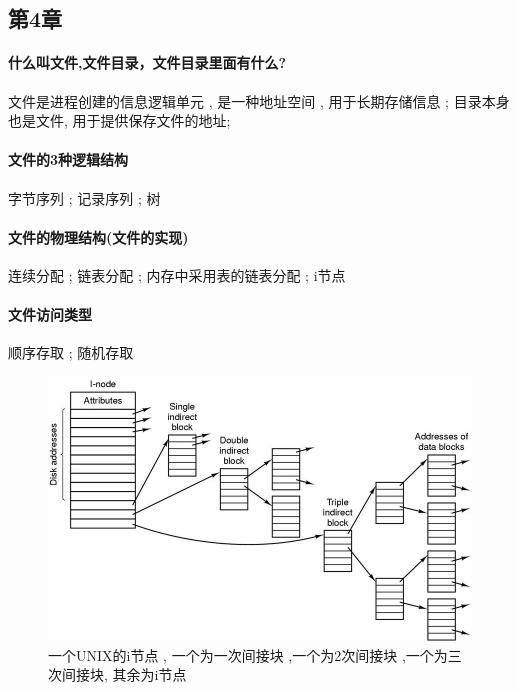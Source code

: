 \documentclass[UTF8,a4paper]{ctexart}
\begin{document}
\subsection{第4章}
\paragraph{什么叫文件,文件目录，文件目录里面有什么?}
文件是进程创建的信息逻辑单元 , 是一种地址空间 , 用于长期存储信息 ; 目录本身也是文件, 用于提供保存文件的地址;

\paragraph{文件的3种逻辑结构}  字节序列 ; 记录序列 ; 树

\paragraph{文件的物理结构(文件的实现)} 连续分配 ; 链表分配 ; 内存中采用表的链表分配 ; i节点

\paragraph{文件访问类型} 顺序存取 ; 随机存取

\begin{figure}[H]
	\centering
	\includegraphics[scale = 0.6]{assets/ModernOperatingSystems/2018-01-08-19-49-31.png}
	\caption{一个UNIX的i节点 , 一个为一次间接块 ,一个为2次间接块 ,一个为三次间接块, 其余为i节点}
\end{figure}
\end{document}

